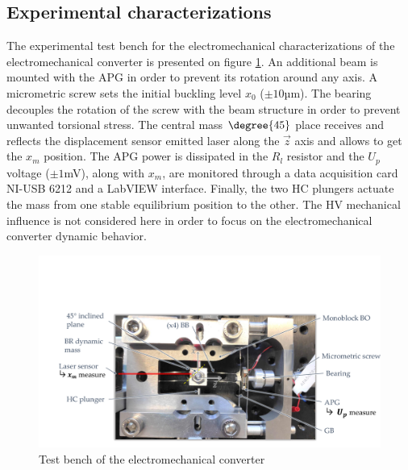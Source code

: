 \documentclass[3p,twocolumn,preprint]{elsarticle}
\begin{document}
	\subsection{Experimental characterizations}	
	\label{subsec:Experimental characterizations}
The experimental test bench for the electromechanical characterizations of the electromechanical converter is presented on figure \ref{fig:BDT_OB+GPA}. An additional beam is mounted with the APG in order to prevent its rotation around any axis. A micrometric screw sets the initial buckling level $x_0$ ($\pm 10$µm). The bearing decouples the rotation of the screw with the beam structure in order to prevent unwanted torsional stress. The central mass $\degree{45}$ place receives and reflects the displacement sensor emitted laser along the $\vec{z}$ axis and allows to get the $x_m$ position. The APG power is dissipated in the $R_l$ resistor and the $U_p$ voltage ($\pm 1$mV), along with $x_m$, are monitored through a data acquisition card NI-USB 6212 and a LabVIEW interface. Finally, the two HC plungers actuate the mass from one stable equilibrium position to the other. The HV mechanical influence is not considered here in order to focus on the electromechanical converter dynamic behavior. 
\begin{figure}[!htbp]
	\centering
	\captionsetup{justification=centering}
	\includegraphics[trim={2cm 0cm 0cm 5.5cm},clip,width=\linewidth]{figures/BDT_OB+GPA.pdf}
	\caption{Test bench of the electromechanical converter}
	\label{fig:BDT_OB+GPA}
\end{figure}
\end{document}
